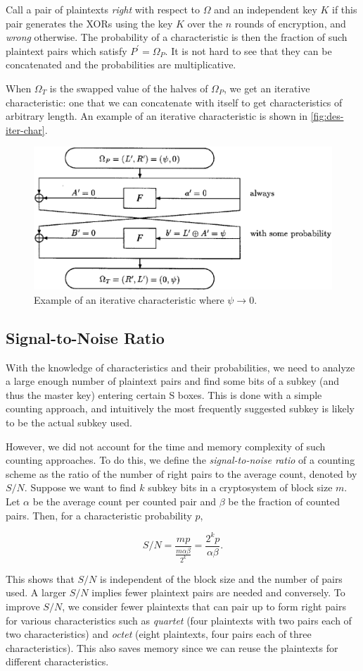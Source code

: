 \documentclass[twoside]{article}
\begin{document}
Call a pair of plaintexts \emph{right} with respect to \(\Omega\) and an independent key \(K\) if this pair generates the XORs using the key \(K\) over the \(n\) rounds of encryption, and \emph{wrong} otherwise. The probability of a characteristic is then the fraction of such plaintext pairs which satisfy \(P^\prime = \Omega_P\). It is not hard to see that they can be concatenated and the probabilities are multiplicative.

When \(\Omega_T\) is the swapped value of the halves of \(\Omega_P\), we get an iterative characteristic: one that we can concatenate with itself to get characteristics of arbitrary length. An example of an iterative characteristic is shown in \autoref{fig:des-iter-char}.

\begin{figure}[!ht]
    \centering
    \includegraphics[width=0.5\linewidth]{images/des_iter_char.png}
    \caption{Example of an iterative characteristic where \(\psi \rightarrow 0\).}
    \label{fig:des-iter-char}
\end{figure}

\subsection{Signal-to-Noise Ratio}
With the knowledge of characteristics and their probabilities, we need to analyze a large enough number of plaintext pairs and find some bits of a subkey (and thus the master key) entering certain S boxes. This is done with a simple counting approach, and intuitively the most frequently suggested subkey is likely to be the actual subkey used.

However, we did not account for the time and memory complexity of such counting approaches. To do this, we define the \emph{signal-to-noise ratio} of a counting scheme as the ratio of the number of right pairs to the average count, denoted by \(S/N\). Suppose we want to find \(k\) subkey bits in a cryptosystem of block size \(m\). Let \(\alpha\) be the average count per counted pair and \(\beta\) be the fraction of counted pairs. Then, for a characteristic probability \(p\),

\begin{equation}
    S/N = \frac{mp}{\frac{m\alpha\beta}{2^k}} = \frac{2^kp}{\alpha\beta}.
\end{equation}

This shows that \(S/N\) is independent of the block size and the number of pairs used. A larger \(S/N\) implies fewer plaintext pairs are needed and conversely. To improve \(S/N\), we consider fewer plaintexts that can pair up to form right pairs for various characteristics such as \emph{quartet} (four plaintexts with two pairs each of two characteristics) and \emph{octet} (eight plaintexts, four pairs each of three characteristics). This also saves memory since we can reuse the plaintexts for different characteristics.
\end{document}
